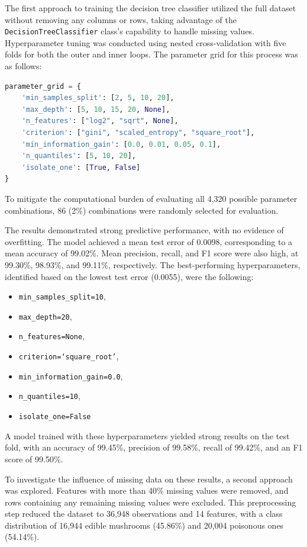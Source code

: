\documentclass{article}
\begin{document}
The first approach to training the decision tree classifier utilized the full dataset without removing any columns or rows, taking advantage of the \texttt{DecisionTreeClassifier} class's capability to handle missing values. Hyperparameter tuning was conducted using nested cross-validation with five folds for both the outer and inner loops. The parameter grid for this process was as follows:

\begin{scriptsize}
\begin{lstlisting}[language=Python]
parameter_grid = {
    'min_samples_split': [2, 5, 10, 20],
    'max_depth': [5, 10, 15, 20, None],
    'n_features': ["log2", "sqrt", None],
    'criterion': ["gini", "scaled_entropy", "square_root"],
    'min_information_gain': [0.0, 0.01, 0.05, 0.1],
    'n_quantiles': [5, 10, 20],
    'isolate_one': [True, False]
}
\end{lstlisting}
\end{scriptsize}

\noindent To mitigate the computational burden of evaluating all 4,320 possible parameter combinations, 86 (2\%) combinations were randomly selected for evaluation.

The results demonstrated strong predictive performance, with no evidence of overfitting. The model achieved a mean test error of 0.0098, corresponding to a mean accuracy of 99.02\%. Mean precision, recall, and F1 score were also high, at 99.30\%, 98.93\%, and 99.11\%, respectively. The best-performing hyperparameters, identified based on the lowest test error (0.0055), were the following:\
\begin{itemize}
\item \texttt{min\_samples\_split=10},
\item \texttt{max\_depth=20},
\item \texttt{n\_features=None},
\item \texttt{criterion=`square\_root'},
\item \texttt{min\_information\_gain=0.0},
\item \texttt{n\_quantiles=10},
\item \texttt{isolate\_one=False}
\end{itemize}

\noindent A model trained with these hyperparameters yielded strong results on the test fold, with an accuracy of 99.45\%, precision of 99.58\%, recall of 99.42\%, and an F1 score of 99.50\%.

To investigate the influence of missing data on these results, a second approach was explored. Features with more than 40\% missing values were removed, and rows containing any remaining missing values were excluded. This preprocessing step reduced the dataset to 36,948 observations and 14 features, with a class distribution of 16,944 edible mushrooms (45.86\%) and 20,004 poisonous ones (54.14\%).
\end{document}

